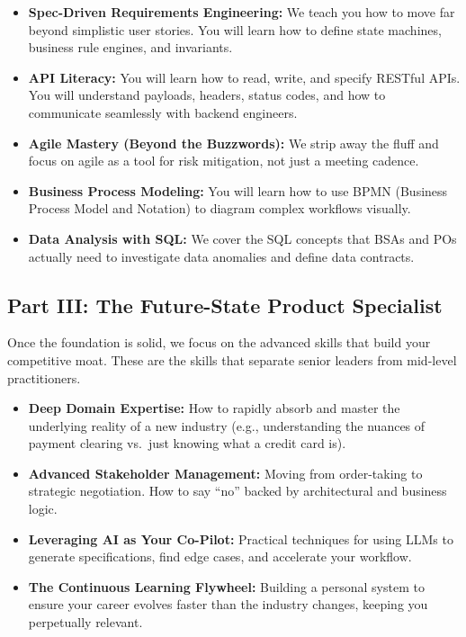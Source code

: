 \begin{itemize}
\tightlist
\item
  \textbf{Spec-Driven Requirements Engineering:} We teach you how to
  move far beyond simplistic user stories. You will learn how to define
  state machines, business rule engines, and invariants.
\item
  \textbf{API Literacy:} You will learn how to read, write, and specify
  RESTful APIs. You will understand payloads, headers, status codes, and
  how to communicate seamlessly with backend engineers.
\item
  \textbf{Agile Mastery (Beyond the Buzzwords):} We strip away the fluff
  and focus on agile as a tool for risk mitigation, not just a meeting
  cadence.
\item
  \textbf{Business Process Modeling:} You will learn how to use BPMN
  (Business Process Model and Notation) to diagram complex workflows
  visually.
\item
  \textbf{Data Analysis with SQL:} We cover the SQL concepts that BSAs
  and POs actually need to investigate data anomalies and define data
  contracts.
\end{itemize}

\subsection{Part III: The Future-State Product
Specialist}\label{part-iii-the-future-state-product-specialist}

Once the foundation is solid, we focus on the advanced skills that build
your competitive moat. These are the skills that separate senior leaders
from mid-level practitioners.

\begin{itemize}
\tightlist
\item
  \textbf{Deep Domain Expertise:} How to rapidly absorb and master the
  underlying reality of a new industry (e.g., understanding the nuances
  of payment clearing vs.~just knowing what a credit card is).
\item
  \textbf{Advanced Stakeholder Management:} Moving from order-taking to
  strategic negotiation. How to say ``no'' backed by architectural and
  business logic.
\item
  \textbf{Leveraging AI as Your Co-Pilot:} Practical techniques for
  using LLMs to generate specifications, find edge cases, and accelerate
  your workflow.
\item
  \textbf{The Continuous Learning Flywheel:} Building a personal system
  to ensure your career evolves faster than the industry changes,
  keeping you perpetually relevant.
\end{itemize}

